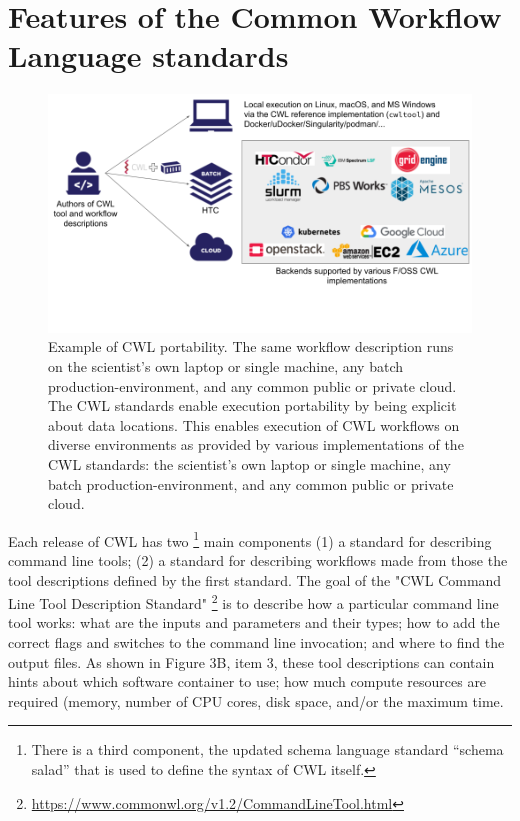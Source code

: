 \documentclass[sigconf,authordraft]{acmart}
\begin{document}
\section{Features of the Common Workflow Language standards}


\begin{figure}
  \centering
  \includegraphics[width=\textwidth]{figure2.png}
  \caption{Example of CWL portability. The same workflow description runs on the scientist's own
  laptop or single machine, any batch production-environment, and any
common public or private cloud. The CWL standards enable execution
portability by being explicit about data locations. This enables
execution of CWL workflows on diverse environments as provided by
various implementations of the CWL standards: the scientist's own laptop
or single machine, any batch production-environment, and any common
public or private cloud.}
\end{figure}

Each release of CWL has two
\footnote{There is a third component, the updated schema language standard “schema salad” that is used to define the syntax of CWL itself.}
main components (1) a standard for describing command line tools; (2) a
standard for describing workflows made from those the tool descriptions
defined by the first standard. The goal of the "CWL Command Line Tool
Description Standard" \footnote{\url{https://www.commonwl.org/v1.2/CommandLineTool.html}}
is to
describe how a particular command line tool works: what are the inputs
and parameters and their types; how to add the correct flags and
switches to the command line invocation; and where to find the output
files. As shown in Figure 3B, item 3, these tool descriptions can
contain hints about which software container to use; how much compute
resources are required (memory, number of CPU cores, disk space, and/or
the maximum time.
\end{document}
